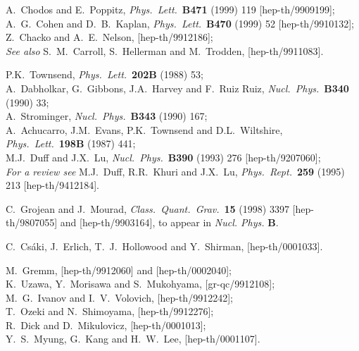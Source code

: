 \documentclass[a4paper,12pt]{article}
\begin{document}
\begin{thebibliography}{99}
A.~Chodos and E.~Poppitz,
{\it Phys.\ Lett.}\  {\bf B471} (1999) 119
[hep-th/9909199];\\
%
A.~G.~Cohen and D.~B.~Kaplan,
{\it Phys.\ Lett.}\  {\bf B470} (1999) 52
[hep-th/9910132];\\
%
Z.~Chacko and A.~E.~Nelson,
[hep-th/9912186];\\
%
{\it See also} S.~M.~Carroll, S.~Hellerman and M.~Trodden,
[hep-th/9911083].



P.K.~Townsend,
{\it Phys.\ Lett.}\ {\bf 202B} (1988)  53; \\
%
A.~Dabholkar, G.~Gibbons, J.A.~Harvey and F.~Ruiz Ruiz,
{\it Nucl.\ Phys.}\ {\bf B340} (1990) 33; \\
%
A.~Strominger,
{\it Nucl.\ Phys.}\ {\bf B343} (1990) 167;\\
%
A.~Achucarro, J.M.~Evans, P.K.~Townsend and D.L.~Wiltshire,
{\it Phys.\ Lett.}\ {\bf 198B} (1987) 441; \\
%
M.J.~Duff and J.X.~Lu,
{\it Nucl.\ Phys.}\ {\bf B390} (1993) 276
[hep-th/9207060];\\
%
{\it For a review see}
M.J.~Duff, R.R.~Khuri and J.X.~Lu,
{\it Phys.\ Rept.}\ {\bf 259} (1995) 213
[hep-th/9412184].

C.~Grojean and J.~Mourad,
{\it Class.\ Quant.\ Grav.}\  {\bf 15} (1998) 3397
[hep-th/9807055]
%
and
[hep-th/9903164], to appear in {\it Nucl. Phys.} {\bf B}.


C.~Cs\'aki, J.~Erlich, T.~J.~Hollowood and Y.~Shirman,
[hep-th/0001033].


M.~Gremm,
[hep-th/9912060]
and
[hep-th/0002040];\\
%
K.~Uzawa, Y.~Morisawa and S.~Mukohyama,
[gr-qc/9912108];\\
%
M.~G.~Ivanov and I.~V.~Volovich,
[hep-th/9912242];\\
%
T.~Ozeki and N.~Shimoyama,
[hep-th/9912276];\\
%
R.~Dick and D.~Mikulovicz,
[hep-th/0001013];\\
%
Y.~S.~Myung, G.~Kang and H.~W.~Lee,
[hep-th/0001107].



\end{thebibliography}
\end{document}
